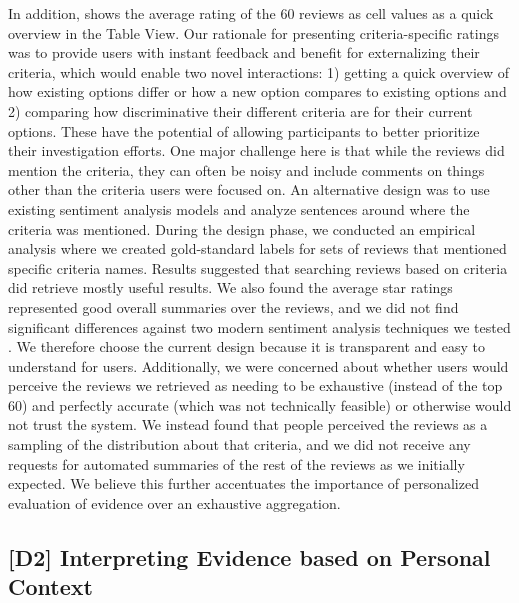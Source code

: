 In addition, \SYSTEM shows the average rating of the 60 reviews as cell values as a quick overview in the Table View. Our rationale for presenting criteria-specific ratings was to provide users with instant feedback and benefit for externalizing their criteria, which would enable two novel interactions: 1) getting a quick overview of how existing options differ or how a new option compares to existing options and 2) comparing how discriminative their different criteria are for their current options. These have the potential of allowing participants to better prioritize their investigation efforts. One major challenge here is that while the reviews did mention the criteria, they can often be noisy and include comments on things other than the criteria users were focused on. An alternative design was to use existing sentiment analysis models and analyze sentences around where the criteria was mentioned. During the design phase,  we conducted an empirical analysis where we created gold-standard labels for sets of reviews that mentioned specific criteria names. Results suggested that searching reviews based on criteria did retrieve mostly useful results. We also found the average star ratings represented good overall summaries over the reviews, and we did not find significant differences against two modern sentiment analysis techniques we tested \cite{hutto2014vader,akbik2019flair}. We therefore choose the current design because it is transparent and easy to understand for users. Additionally, we were concerned about whether users would perceive the reviews we retrieved as needing to be exhaustive (instead of the top 60) and perfectly accurate (which was not technically feasible) or otherwise would not trust the system. We instead found that people perceived the reviews as a sampling of the distribution about that criteria, and we did not receive any requests for automated summaries of the rest of the reviews as we initially expected. We believe this further accentuates the importance of personalized evaluation of evidence over an exhaustive aggregation.


\subsection{[D2] Interpreting Evidence based on Personal Context}

